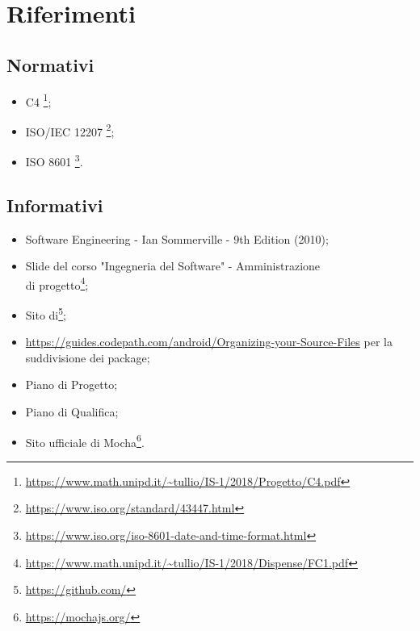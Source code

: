 \section{Riferimenti}
\subsection{Normativi}
\begin{itemize}
	\item {} C4
	\footnote{\url{https://www.math.unipd.it/~tullio/IS-1/2018/Progetto/C4.pdf}};
	
	\item ISO/IEC 12207
	\footnote{\url{https://www.iso.org/standard/43447.html}};
	
	\item ISO 8601
	\footnote{\url{https://www.iso.org/iso-8601-date-and-time-format.html}}.
\end{itemize}
\subsection{Informativi}
\begin{itemize}
	\item Software Engineering - Ian Sommerville - 9th Edition (2010);
	
	\item Slide del corso "Ingegneria del Software" - Amministrazione\\ di progetto\footnote{\url{https://www.math.unipd.it/~tullio/IS-1/2018/Dispense/FC1.pdf}};
	
	\item Sito di\footnote{\url{https://github.com/}};
	\item \url{https://guides.codepath.com/android/Organizing-your-Source-Files} per la suddivisione dei package; \label{package}
	\item Piano di Progetto;
	\item Piano di Qualifica;
	\item Sito ufficiale di Mocha\footnote{\url{https://mochajs.org/}}.
	
\end{itemize}
\newpage
